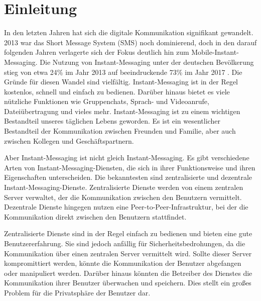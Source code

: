 \chapter{Einleitung}
\label{chap:einleitung}


In den letzten Jahren hat sich die digitale Kommunikation signifikant gewandelt. 2013 war das Short Message System (SMS) noch dominierend, doch in den darauf folgenden Jahren verlagerte sich der Fokus deutlich hin zum Mobile-Instant-Messaging. Die Nutzung von Instant-Messaging unter der deutschen Bevölkerung stieg von etwa 24\% im Jahr 2013 auf beeindruckende 73\% im Jahr 2017 \parencite{Hedda_digiKommunikationVeraendert}. Die Gründe für diesen Wandel sind vielfältig. Instant-Messaging ist in der Regel kostenlos, schnell und einfach zu bedienen. Darüber hinaus bietet es viele nützliche Funktionen wie Gruppenchats, Sprach- und Videoanrufe, Dateiübertragung und vieles mehr. Instant-Messaging ist zu einem wichtigen Bestandteil unseres täglichen Lebens geworden. Es ist ein wesentlicher Bestandteil der Kommunikation zwischen Freunden und Familie, aber auch zwischen Kollegen und Geschäftspartnern. 

Aber Instant-Messaging ist nicht gleich Instant-Messaging. Es gibt verschiedene Arten von Instant-Messaging-Diensten, die sich in ihrer Funktionsweise und ihren Eigenschaften unterscheiden. Die bekanntesten sind zentralisierte und dezentrale Instant-Messaging-Dienste. Zentralisierte Dienste werden von einem zentralen Server verwaltet, der die Kommunikation zwischen den Benutzern vermittelt. Dezentrale Dienste hingegen nutzen eine Peer-to-Peer-Infrastruktur, bei der die Kommunikation direkt zwischen den Benutzern stattfindet. 

Zentralisierte Dienste sind in der Regel einfach zu bedienen und bieten eine gute Benutzererfahrung. Sie sind jedoch anfällig für Sicherheitsbedrohungen, da die Kommunikation über einen zentralen Server vermittelt wird. Sollte dieser Server kompromittiert werden, könnte die Kommunikation der Benutzer abgefangen oder manipuliert werden. Darüber hinaus könnten die Betreiber des Dienstes die Kommunikation ihrer Benutzer überwachen und speichern. Dies stellt ein großes Problem für die Privatsphäre der Benutzer dar.

